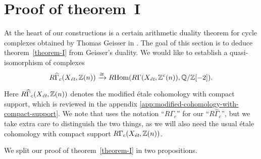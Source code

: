 \documentclass{article}
\numberwithin{equation}{section}
\begin{document}

\section{Proof of theorem~I}
\label{sec:arithmetic-duality-theorem}

At the heart of our constructions is a certain arithmetic duality theorem for
cycle complexes obtained by Thomas Geisser in \cite{Geisser-2010}. The goal of
this section is to deduce theorem~\ref{theorem-I} from Geisser's duality.
We would like to establish a quasi-isomorphism of complexes
\[ R\widehat{\Gamma}_c (X_\et, \ZZ (n)) \xrightarrow{\cong}
\RHom (R\Gamma (X_\et, \ZZ^c (n)), \QQ/\ZZ [-2]). \]

Here $R\widehat{\Gamma}_c (X_\et, \ZZ (n))$ denotes the modified étale
cohomology with compact support, which is reviewed in the appendix
\ref{app:modified-cohomology-with-compact-support}. We note that
\cite{Geisser-2010} uses the notation ``$R\Gamma_c$'' for our
``$R\widehat{\Gamma}_c$'', but we take extra care to distinguish the two things,
as we will also need the usual étale cohomology with compact support
$R\Gamma_c (X_\et, \ZZ (n))$.

We split our proof of theorem~\ref{theorem-I} in two propositions.
\end{document}
